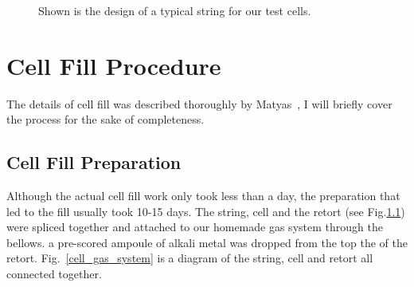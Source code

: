 \begin{figure}[t!]
	\centering
	\caption{{Shown is the design of a typical string for our test cells.}}
	\label{string}
\end{figure}

\section{Cell Fill Procedure}

The details of cell fill was described thoroughly by Matyas~\cite{DanThesis}, I will briefly cover the process for the sake of completeness.

\subsection{Cell Fill Preparation}

Although the actual cell fill work only took less than a day, the preparation that led to the fill usually took 10-15 days. The string, cell and the retort (see Fig.\ref{}) were spliced together and attached to our homemade gas system through the bellows. a pre-scored ampoule of alkali metal was dropped from the top the of the retort.  Fig.~\ref{cell_gas_system} is a diagram of the string, cell and retort all connected together. 

